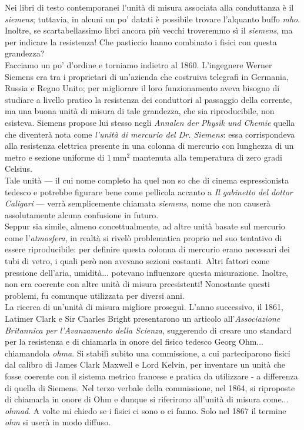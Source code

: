 \begin{digressionwt}
	Nei libri di testo contemporanei l'unità di misura associata alla conduttanza è il \textit{siemens}; tuttavia, in alcuni un po' datati è possibile trovare l'alquanto buffo \textit{mho}. Inoltre, se scartabellassimo libri ancora più vecchi troveremmo sì il \textit{siemens}, ma per indicare la resistenza! Che pasticcio hanno combinato i fisici con questa grandezza?\newline~\\
	Facciamo un po' d'ordine e torniamo indietro al 1860. L'ingegnere Werner Siemens era tra i proprietari di un'azienda che costruiva telegrafi in Germania, Russia e Regno Unito; per migliorare il loro funzionamento aveva bisogno di studiare a livello pratico la resistenza dei conduttori al passaggio della corrente, ma una buona unità di misura di tale grandezza, che sia riproducibile, non esisteva. Siemens propose lui stesso negli \textit{Annalen der Physik und Chemie} quella che diventerà nota come \textit{l'unità di mercurio del Dr. Siemens}: essa corrispondeva alla resistenza elettrica presente in una colonna di mercurio con lunghezza di un metro e sezione uniforme di $\SI{1}{\milli\metre\squared}$ mantenuta alla temperatura di zero gradi Celsius.\\
	Tale unità --- il cui nome completo ha quel non so che di cinema espressionista tedesco e potrebbe figurare bene come pellicola accanto a \textit{Il gabinetto del dottor Caligari} --- verrà semplicemente chiamata \textit{siemens}, nome che non causerà assolutamente alcuna confusione in futuro.\\
	Seppur sia simile, almeno concettualmente, ad altre unità basate sul mercurio come l'\textit{atmosfera}, in realtà si rivelò problematica proprio nel suo tentativo di essere riproducibile: per definire questa colonna di mercurio erano necessari dei tubi di vetro, i quali però non avevano sezioni costanti. Altri fattori come pressione dell'aria, umidità... potevano influenzare questa misurazione. Inoltre, non era coerente con altre unità di misura preesistenti! Nonostante questi problemi, fu comunque utilizzata per diversi anni.\newline~\\
	La ricerca di un'unità di misura migliore proseguì. L'anno successivo, il 1861, Latimer Clark e Sir Charles Bright presentarono un articolo all'\textit{Associazione Britannica per l'Avanzamento della Scienza}, suggerendo di creare uno standard per la resistenza e di chiamarla in onore del fisico tedesco Georg Ohm... chiamandola \textit{ohma}. Si stabilì subito una commissione, a cui parteciparono fisici dal calibro di James Clark Maxwell e Lord Kelvin, per inventare un unità che fosse coerente con il sistema metrico francese e pratica da utilizzare - a differenza di quella di Siemens.
	Nel terzo verbale della commissione, nel 1864, si riproposte di chiamarla in onore di Ohm e dunque si riferirono all'unità di misura come... \textit{ohmad}. A volte mi chiedo se i fisici ci sono o ci fanno. Solo nel 1867 il termine \textit{ohm} si userà in modo diffuso.
	

\end{digressionwt}
